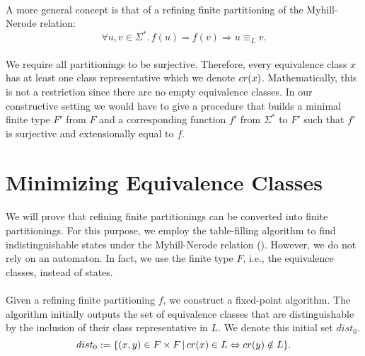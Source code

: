 \paragraph{}

A more general concept is that of a refining finite partitioning of the Myhill-Nerode relation:
\begin{equation*}
    \forall u, v \in \Sigma^*. \,
    f(u) = f(v) \Rightarrow u \equiv_L v.
\end{equation*}




\paragraph{}
We require all partitionings to be surjective.
Therefore, every equivalence class $x$ has at least one class representative which we denote $cr(x)$.
Mathematically, this is not a restriction since there are no empty equivalence classes.
In our constructive setting we would have to give a procedure that builds a minimal finite type $F'$ from $F$ and a corresponding function $f'$ from $\Sigma^*$ to $F'$ such that $f'$ is surjective and extensionally equal to $f$.

\section{Minimizing Equivalence Classes}

\paragraph{}
We will prove that refining finite partitionings can be converted into finite partitionings. 
For this purpose, we employ the table-filling algorithm to find indistinguishable states under the Myhill-Nerode relation (\cite{DBLP:books/daglib/0011126}).
However, we do not rely on an automaton. 
In fact, we use the finite type $F$, i.e., the equivalence classes, instead of states.

\paragraph{}
Given a refining finite partitioning $f$, we construct a fixed-point algorithm.
The algorithm initially outputs the set of equivalence classes that are distinguishable by the inclusion of their class representative in $L$. 
We denote this initial set $dist_0$.
\begin{equation*}
    dist_0 := \{ (x,y)  \in F \times F \, | \, cr(x) \in L \Leftrightarrow cr(y) \notin L\}.
\end{equation*}

